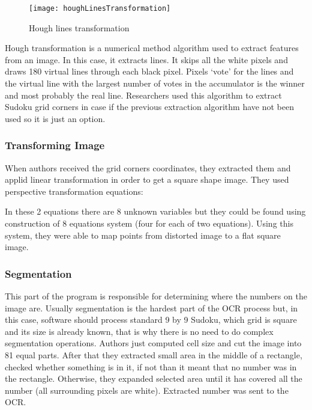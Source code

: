 \documentclass[../../main]{subfiles}
\begin{document}
\begin{figure} [ht]
\begin{center}
\texttt{[image: houghLinesTransformation]}
\caption{Hough lines transformation}
\label{fig:houghLinesTransformation}
\end{center}
\end{figure}

Hough transformation is a numerical method algorithm used to extract features from an image. In this case, it extracts lines. It skips all the white pixels and draws 180 virtual lines through each black pixel. Pixels ‘vote’ for the lines and the virtual line with the largest number of votes in the accumulator is the winner and most probably the real line.
Researchers used this algorithm to extract Sudoku grid corners in case if the previous extraction algorithm have not been used so it is just an option.

\subsubsection{Transforming Image}

When authors received the grid corners coordinates, they extracted them and applid linear transformation in order to get a square shape image. They used perspective transformation equations:

In these 2 equations there are 8 unknown variables but they could be found using construction of 8 equations system (four for each of two equations). Using this system, they were able to map points from distorted image to a flat square image.

\subsubsection{Segmentation}

This part of the program is responsible for determining where the numbers on the image are. Usually segmentation is the hardest part of the OCR process but, in this case, software should process standard 9 by 9 Sudoku, which grid is square and its size is already known, that is why there is no need to do complex segmentation operations. Authors just computed cell size and cut the image into 81 equal parts.
After that they extracted small area in the middle of a rectangle, checked whether something is in it, if not than it meant that no number was in the rectangle. Otherwise, they expanded selected area until it has covered all the number (all surrounding pixels are white). Extracted number was sent to the OCR.
\end{document}
